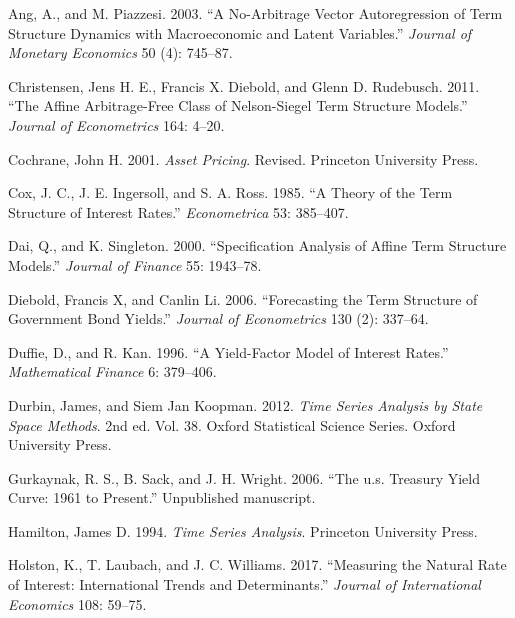 \documentclass[
  letterpaper,
  DIV=11,
  numbers=noendperiod]{scrreprt}
\newlength{\cslhangindent}
\newenvironment{CSLReferences}[2] %
 {\begin{list}{}{%
  \setlength{\itemindent}{0pt}
  \setlength{\leftmargin}{0pt}
  \setlength{\parsep}{0pt}
  \ifodd #1
   \setlength{\leftmargin}{\cslhangindent}
   \setlength{\itemindent}{-1\cslhangindent}
  \fi
  \setlength{\itemsep}{#2\baselineskip}}}
 {\end{list}}
\begin{document}
\protect{}\label{refs}
\begin{CSLReferences}{1}{1}
Ang, A., and M. Piazzesi. 2003. {``A No-Arbitrage Vector Autoregression
of Term Structure Dynamics with Macroeconomic and Latent Variables.''}
\emph{Journal of Monetary Economics} 50 (4): 745--87.

Christensen, Jens H. E., Francis X. Diebold, and Glenn D. Rudebusch.
2011. {``The Affine Arbitrage-Free Class of {N}elson-{S}iegel Term
Structure Models.''} \emph{Journal of Econometrics} 164: 4--20.

Cochrane, John H. 2001. \emph{Asset Pricing}. Revised. Princeton
University Press.

Cox, J. C., J. E. Ingersoll, and S. A. Ross. 1985. {``A Theory of the
Term Structure of Interest Rates.''} \emph{Econometrica} 53: 385--407.

Dai, Q., and K. Singleton. 2000. {``Specification Analysis of Affine
Term Structure Models.''} \emph{Journal of Finance} 55: 1943--78.

Diebold, Francis X, and Canlin Li. 2006. {``Forecasting the Term
Structure of Government Bond Yields.''} \emph{Journal of Econometrics}
130 (2): 337--64.

Duffie, D., and R. Kan. 1996. {``A Yield-Factor Model of Interest
Rates.''} \emph{Mathematical Finance} 6: 379--406.

Durbin, James, and Siem Jan Koopman. 2012. \emph{Time Series Analysis by
State Space Methods}. 2nd ed. Vol. 38. Oxford Statistical Science
Series. Oxford University Press.

Gurkaynak, R. S., B. Sack, and J. H. Wright. 2006. {``The u.s. Treasury
Yield Curve: 1961 to Present.''} Unpublished manuscript.

Hamilton, James D. 1994. \emph{Time Series Analysis}. Princeton
University Press.

Holston, K., T. Laubach, and J. C. Williams. 2017. {``Measuring the
Natural Rate of Interest: International Trends and Determinants.''}
\emph{Journal of International Economics} 108: 59--75.


\end{CSLReferences}
\end{document}
